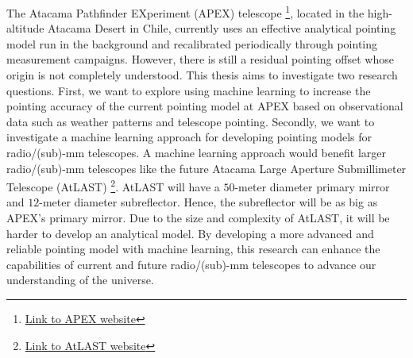 The Atacama Pathfinder EXperiment (APEX) telescope \footnote[1]{\href{http://www.apex-telescope.org/ns/}{Link to APEX website}}, located in the high-altitude Atacama Desert in Chile,
currently uses an effective analytical pointing model run in the background and recalibrated periodically through pointing measurement campaigns.
However, there is still a residual pointing offset whose origin is not completely understood.
This thesis aims to investigate two research questions.
First, we want to explore using machine learning to increase the pointing accuracy of the current pointing model at APEX based on observational data such as weather patterns and telescope pointing.
Secondly, we want to investigate a machine learning approach for developing pointing models for radio/(sub)-mm telescopes.
A machine learning approach would benefit larger radio/(sub)-mm telescopes like the future Atacama Large Aperture Submillimeter Telescope (AtLAST)
\footnote[2]{\href{https://www.atlast.uio.no/}{Link to AtLAST website}}.
AtLAST will have a $50$-meter diameter primary mirror and $12$-meter diameter subreflector. Hence, the subreflector will be as big as APEX's primary mirror.
Due to the size and complexity of AtLAST, it will be harder to develop an analytical model.
By developing a more advanced and reliable pointing model with machine learning,
this research can enhance the capabilities of current and future radio/(sub)-mm telescopes to advance our understanding of the universe.


